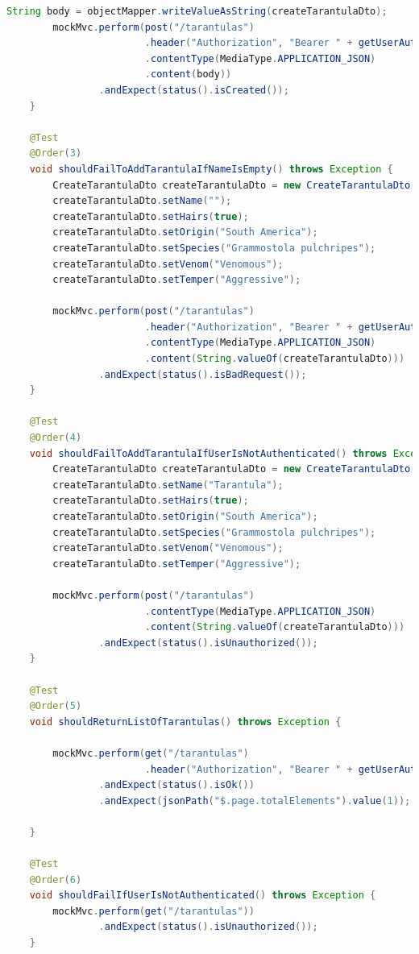 \documentclass[a4paper,12pt,oneside]{article}
\begin{document}
\begin{lstlisting}[language=Java]
        String body = objectMapper.writeValueAsString(createTarantulaDto);
        mockMvc.perform(post("/tarantulas")
                        .header("Authorization", "Bearer " + getUserAuthToken())
                        .contentType(MediaType.APPLICATION_JSON)
                        .content(body))
                .andExpect(status().isCreated());
    }

    @Test
    @Order(3)
    void shouldFailToAddTarantulaIfNameIsEmpty() throws Exception {
        CreateTarantulaDto createTarantulaDto = new CreateTarantulaDto();
        createTarantulaDto.setName("");
        createTarantulaDto.setHairs(true);
        createTarantulaDto.setOrigin("South America");
        createTarantulaDto.setSpecies("Grammostola pulchripes");
        createTarantulaDto.setVenom("Venomous");
        createTarantulaDto.setTemper("Aggressive");

        mockMvc.perform(post("/tarantulas")
                        .header("Authorization", "Bearer " + getUserAuthToken())
                        .contentType(MediaType.APPLICATION_JSON)
                        .content(String.valueOf(createTarantulaDto)))
                .andExpect(status().isBadRequest());
    }

    @Test
    @Order(4)
    void shouldFailToAddTarantulaIfUserIsNotAuthenticated() throws Exception {
        CreateTarantulaDto createTarantulaDto = new CreateTarantulaDto();
        createTarantulaDto.setName("Tarantula");
        createTarantulaDto.setHairs(true);
        createTarantulaDto.setOrigin("South America");
        createTarantulaDto.setSpecies("Grammostola pulchripes");
        createTarantulaDto.setVenom("Venomous");
        createTarantulaDto.setTemper("Aggressive");

        mockMvc.perform(post("/tarantulas")
                        .contentType(MediaType.APPLICATION_JSON)
                        .content(String.valueOf(createTarantulaDto)))
                .andExpect(status().isUnauthorized());
    }

    @Test
    @Order(5)
    void shouldReturnListOfTarantulas() throws Exception {

        mockMvc.perform(get("/tarantulas")
                        .header("Authorization", "Bearer " + getUserAuthToken()))
                .andExpect(status().isOk())
                .andExpect(jsonPath("$.page.totalElements").value(1));

    }

    @Test
    @Order(6)
    void shouldFailIfUserIsNotAuthenticated() throws Exception {
        mockMvc.perform(get("/tarantulas"))
                .andExpect(status().isUnauthorized());
    }


\end{lstlisting}
\end{document}
